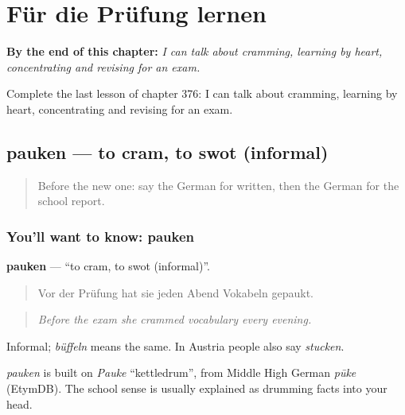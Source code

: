 
\chapter{Für die Prüfung lernen}
\label{ch:ge-fur-die-prufung-lernen}

\begin{chapteropening}
\textbf{By the end of this chapter:} \emph{I can talk about cramming, learning by heart, concentrating and revising for an exam.}

Complete the last lesson of chapter 376: I can talk about cramming, learning by heart, concentrating and revising for an exam.
\end{chapteropening}

\section[pauken]{pauken — to cram, to swot (informal)}

\label{lesson:GE-C376-pauken}



\begin{quote}
Before the new one: say the German for written, then the German for the school report.
\end{quote}

\subsection*{You'll want to know: pauken}
\textbf{pauken} — \textquotedblleft{}to cram, to swot (informal)\textquotedblright{}.

\begin{quote}
Vor der Prüfung hat sie jeden Abend Vokabeln gepaukt.
\end{quote}

\begin{quote}
\emph{Before the exam she crammed vocabulary every evening.}
\end{quote}

Informal; \emph{büffeln} means the same. In Austria people also say \emph{stucken}.

\begin{cousinweb}
\emph{pauken} is built on \emph{Pauke} \textquotedblleft{}kettledrum\textquotedblright{}, from Middle High German \emph{pūke} (EtymDB). The school sense is usually explained as drumming facts into your head.
\end{cousinweb}

